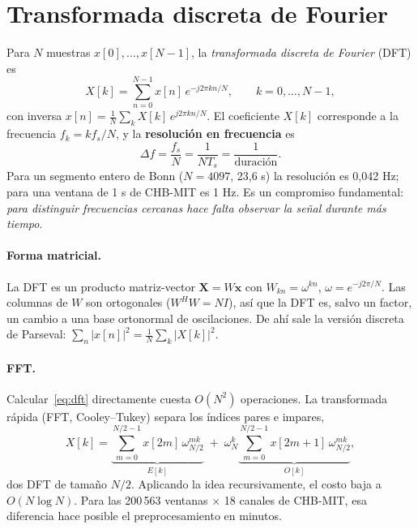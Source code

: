 \section{Transformada discreta de Fourier}

Para $N$ muestras $x[0], \dots, x[N-1]$, la \emph{transformada discreta de Fourier} (DFT) es
\begin{equation}
  X[k] = \sum_{n=0}^{N-1} x[n]\, e^{-j2\pi kn/N}, \qquad k = 0, \dots, N-1,
  \label{eq:dft}
\end{equation}
con inversa $x[n] = \frac1N \sum_{k} X[k]\, e^{j2\pi kn/N}$. El coeficiente $X[k]$ corresponde a la
frecuencia $f_k = k f_s/N$, y la \textbf{resolución en frecuencia} es
\begin{equation}
  \Delta f = \frac{f_s}{N} = \frac{1}{N T_s} = \frac{1}{\text{duración}}.
\end{equation}
Para un segmento entero de Bonn ($N = 4097$, 23,6 s) la resolución es 0,042 Hz; para una ventana de
1 s de CHB-MIT es 1 Hz. Es un compromiso fundamental: \emph{para distinguir frecuencias cercanas hace
falta observar la señal durante más tiempo}.

\paragraph{Forma matricial.} La DFT es un producto matriz-vector $\mathbf{X} = W\mathbf{x}$ con
$W_{kn} = \omega^{kn}$, $\omega = e^{-j2\pi/N}$. Las columnas de $W$ son ortogonales
($W^H W = N I$), así que la DFT es, salvo un factor, un cambio a una base ortonormal de
oscilaciones. De ahí sale la versión discreta de Parseval: $\sum_n |x[n]|^2 = \frac1N\sum_k |X[k]|^2$.

\paragraph{FFT.} Calcular~\eqref{eq:dft} directamente cuesta $O(N^2)$ operaciones. La transformada rápida
(FFT, Cooley--Tukey) separa los índices pares e impares,
\begin{equation}
  X[k] = \underbrace{\sum_{m=0}^{N/2-1} x[2m]\,\omega_{N/2}^{mk}}_{E[k]}
  \;+\; \omega_N^{k} \underbrace{\sum_{m=0}^{N/2-1} x[2m+1]\,\omega_{N/2}^{mk}}_{O[k]},
\end{equation}
dos DFT de tamaño $N/2$. Aplicando la idea recursivamente, el costo baja a $O(N \log N)$. Para las
200\,563 ventanas $\times$ 18 canales de CHB-MIT, esa diferencia hace posible el preprocesamiento en
minutos.

